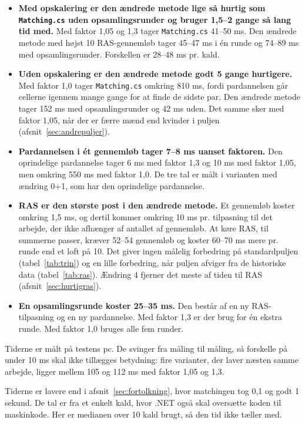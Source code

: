 \documentclass[11pt,a4paper]{article}
\newcommand{\kode}[1]{\texttt{#1}}
\begin{document}
\begin{itemize}
\item \textbf{Med opskalering er den ændrede metode lige så hurtig som \kode{Matching.cs} uden
opsamlingsrunder og bruger 1,5--2 gange så lang tid med.} Med faktor 1,05 og 1,3 tager
\kode{Matching.cs} 41--50 ms. Den ændrede metode med højst 10 RAS-gennemløb tager 45--47 ms i én
runde og 74--89 ms med opsamlingsrunder. Forskellen er 28--48 ms pr. kald.
\item \textbf{Uden opskalering er den ændrede metode godt 5 gange hurtigere.} Med faktor 1,0 tager
\kode{Matching.cs} omkring 810 ms, fordi pardannelsen går cellerne igennem mange gange for at finde
de sidste par. Den ændrede metode tager 152 ms med opsamlingsrunder og 42 ms uden. Det samme sker med
faktor 1,05, når der er færre mænd end kvinder i puljen (afsnit~\ref{sec:andrepuljer}).
\item \textbf{Pardannelsen i ét gennemløb tager 7--8 ms uanset faktoren.} Den oprindelige
pardannelse tager 6 ms med faktor 1,3 og 10 ms med faktor 1,05, men omkring 550 ms med faktor 1,0.
De tre tal er målt i varianten med ændring 0+1, som har den oprindelige pardannelse.
\item \textbf{RAS er den største post i den ændrede metode.} Et gennemløb koster omkring 1,5 ms, og
dertil kommer omkring 10 ms pr. tilpasning til det arbejde, der ikke afhænger af antallet af
gennemløb. At køre RAS, til summerne passer, kræver 52--54 gennemløb og koster 60--70 ms mere pr.
runde end et loft på 10. Det giver ingen målelig forbedring på standardpuljen
(tabel~\ref{tab:trin}) og en lille forbedring, når puljen afviger fra de historiske data
(tabel~\ref{tab:ras}). Ændring 4 fjerner det meste af tiden til RAS
(afsnit~\ref{sec:hurtigras}).
\item \textbf{En opsamlingsrunde koster 25--35 ms.} Den består af en ny RAS-tilpasning og en ny
pardannelse. Med faktor 1,3 er der brug for én ekstra runde. Med faktor 1,0 bruges alle fem runder.
\end{itemize}

Tiderne er målt på testens pc. De svinger fra måling til måling, så forskelle på under 10 ms skal
ikke tillægges betydning: fire varianter, der laver næsten samme arbejde, ligger mellem 105 og 112
ms med faktor 1,05 og 1,3.

Tiderne er lavere end i afsnit~\ref{sec:fortolkning}, hvor matchingen tog 0,1 og godt 1 sekund. De
tal er fra et enkelt kald, hvor .NET også skal oversætte koden til maskinkode. Her er medianen over
10 kald brugt, så den tid ikke tæller med.
\end{document}
